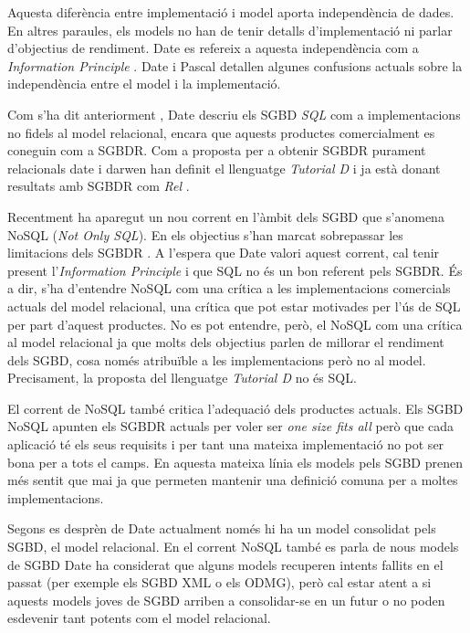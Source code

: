 Aquesta diferència entre implementació i model aporta independència de dades. En altres paraules, els models no han de tenir detalls d'implementació ni parlar d'objectius de rendiment. Date es refereix a aquesta independència com a \emph{Information Principle} .
Date i Pascal  detallen algunes confusions actuals sobre la independència entre el model i la implementació.


Com s'ha dit anteriorment , Date descriu els SGBD \emph{SQL} com a implementacions no fidels al model relacional, encara que aquests productes comercialment es coneguin com a SGBDR. Com a proposta per a obtenir SGBDR purament relacionals date i darwen  han definit el llenguatge \emph{Tutorial D} i ja està donant resultats amb SGBDR com \emph{Rel} .


Recentment ha aparegut un nou corrent en l'àmbit dels SGBD que s'anomena NoSQL (\emph{Not Only SQL}). En els objectius s'han marcat sobrepassar les limitacions dels SGBDR . 
A l'espera que Date valori aquest corrent, cal tenir present l'\emph{Information Principle} i que SQL no és un bon referent pels SGBDR. És a dir, s'ha d'entendre NoSQL com una crítica a les implementacions comercials actuals del model relacional, una crítica que pot estar motivades per l'ús de SQL per part d'aquest productes. 
No es pot entendre, però, el NoSQL com una crítica al model relacional ja que molts dels objectius parlen de millorar el rendiment dels SGBD, cosa només atribuïble a les implementacions però no al model. Precisament, la proposta del llenguatge \emph{Tutorial D} no és SQL.


El corrent de NoSQL també critica l'adequació dels productes actuals.
Els SGBD NoSQL apunten els SGBDR actuals per voler ser \emph{one size fits all} \parencite{stonebraker07,stonebraker09} però que cada aplicació té els seus requisits i per tant una mateixa implementació no pot ser bona per a tots el camps.
En aquesta mateixa línia els models pels SGBD prenen més sentit que mai ja que permeten mantenir una definició comuna per a moltes implementacions.


Segons es desprèn de Date  actualment només hi ha un model consolidat pels SGBD, el model relacional. 
En el corrent NoSQL també es parla de nous models de SGBD  
Date  ha considerat que alguns models recuperen intents fallits en el passat (per exemple els SGBD XML o els ODMG), però cal estar atent a si aquests models joves de SGBD arriben a consolidar-se en un futur o no poden esdevenir tant potents com el model relacional.


